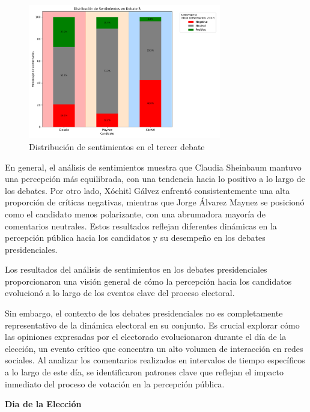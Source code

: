 \documentclass[10pt, a4paper]{article}
\begin{document}
	\begin{figure}[h!] %
		\centering
		\includegraphics[width=0.75\textwidth]{sA_debate3.pdf} %
		\caption{Distribución de sentimientos en el tercer debate} %
		\label{fig:sA_debat3} %
	\end{figure}
	
	En general, el análisis de sentimientos muestra que Claudia Sheinbaum mantuvo una percepción más equilibrada, con una tendencia hacia lo positivo a lo largo de los debates. Por otro lado, Xóchitl Gálvez enfrentó consistentemente una alta proporción de críticas negativas, mientras que Jorge Álvarez Maynez se posicionó como el candidato menos polarizante, con una abrumadora mayoría de comentarios neutrales. Estos resultados reflejan diferentes dinámicas en la percepción pública hacia los candidatos y su desempeño en los debates presidenciales.
	
	Los resultados del análisis de sentimientos en los debates presidenciales proporcionaron una visión general de cómo la percepción hacia los candidatos evolucionó a lo largo de los eventos clave del proceso electoral. 
	
	Sin embargo, el contexto de los debates presidenciales no es completamente representativo de la dinámica electoral en su conjunto. Es crucial explorar cómo las opiniones expresadas por el electorado evolucionaron durante el día de la elección, un evento crítico que concentra un alto volumen de interacción en redes sociales. Al analizar los comentarios realizados en intervalos de tiempo específicos a lo largo de este día, se identificaron patrones clave que reflejan el impacto inmediato del proceso de votación en la percepción pública.
	
	\vspace{3mm}
	\textbf{Dia de la Elección}
	
\end{document}
